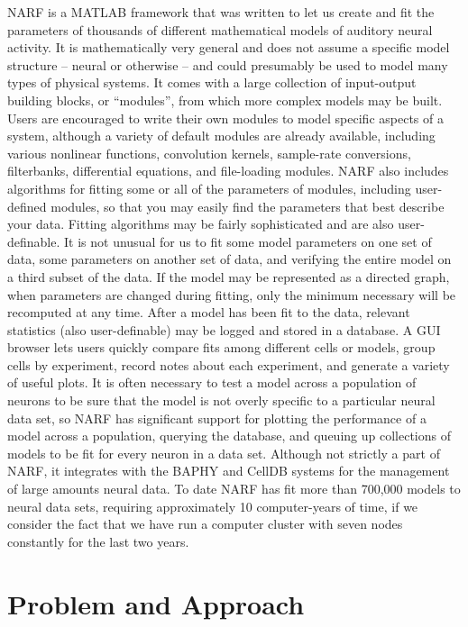 \documentclass[letterpaper]{report}
\begin{document}
NARF is a MATLAB framework that was written to let us create and fit the parameters of thousands of different mathematical models of auditory neural activity. It is mathematically very general and does not assume a specific model structure -- neural or otherwise -- and could presumably be used to model many types of physical systems. It comes with a large collection of input-output building blocks, or ``modules'', from which more complex models may be built. Users are encouraged to write their own modules to model specific aspects of a system, although a variety of default modules are already available, including various nonlinear functions, convolution kernels, sample-rate conversions, filterbanks, differential equations, and file-loading modules. NARF also includes algorithms for fitting some or all of the parameters of modules, including user-defined modules, so that you may easily find the parameters that best describe your data. Fitting algorithms may be fairly sophisticated and are also user-definable. It is not unusual for us to fit some model parameters on one set of data, some parameters on another set of data, and verifying the entire model on a third subset of the data. If the model may be represented as a directed graph, when parameters are changed during fitting, only the minimum necessary will be recomputed at any time. After a model has been fit to the data, relevant statistics (also user-definable) may be logged and stored in a database. A GUI browser lets users quickly compare fits among different cells or models, group cells by experiment, record notes about each experiment, and generate a variety of useful plots. It is often necessary to test a model across a population of neurons to be sure that the model is not overly specific to a particular neural data set, so NARF has significant support for plotting the performance of a model across a population, querying the database, and queuing up collections of models to be fit for every neuron in a data set. Although not strictly a part of NARF, it integrates with the BAPHY and CellDB systems for the management of large amounts neural data. To date NARF has fit more than 700,000 models to neural data sets, requiring approximately 10 computer-years of time, if we consider the fact that we have run a computer cluster with seven nodes constantly for the last two years.

\section{Problem and Approach}
\end{document}
